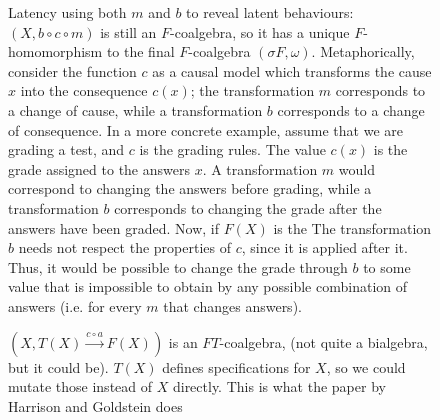 \begin{figure}
    \centering
    \caption{Latency using both $m$ and $b$ to reveal latent behaviours: $(X,b\circ c\circ m)$ is still an $F$-coalgebra, so it has a unique $F$-homomorphism to the final $F$-coalgebra $(\sigma F, \omega)$. Metaphorically, consider the function $c$ as a causal model which transforms the cause $x$ into the consequence $c(x)$; the transformation $m$ corresponds to a change of cause, while a transformation $b$ corresponds to a change of consequence. In a more concrete example, assume that we are grading a test, and $c$ is the grading rules. The value $c(x)$ is the grade assigned to the answers $x$. A transformation $m$ would correspond to changing the answers before grading, while a transformation $b$ corresponds to changing the grade after the answers have been graded. Now, if $F(X)$ is the The transformation $b$ needs not respect the properties of $c$, since it is applied after it. Thus, it would be possible to change the grade through $b$ to some value that is impossible to obtain by any possible combination of answers (i.e. for every $m$ that changes answers).}
\end{figure}
\begin{figure}
    \centering
    \caption{$(X,T(X)\xrightarrow{c\circ a}F(X))$ is an $FT$-coalgebra, (not quite a bialgebra, but it could be). $T(X)$ defines specifications for $X$, so we could mutate those instead of $X$ directly. This is what the paper by Harrison and Goldstein does \cite{DoJudgeATestByItsCover}}
\end{figure}



